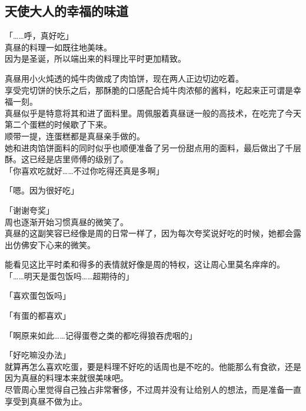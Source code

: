 \subsection{天使大人的幸福的味道}

「……呼，真好吃」\\

真昼的料理一如既往地美味。\\

因为是圣诞，所以端出来的料理比平时更加精致。

真昼用小火炖透的炖牛肉做成了肉馅饼，现在两人正边切边吃着。\\

享受完切饼的快乐之后，那酥脆的口感配合炖牛肉浓郁的酱料，吃起来正可谓是幸福一刻。\\

真昼似乎是特意将其和进了面料里。周佩服着真昼谜一般的高技术，在吃完了今天第二个蛋糕的时候歇了下来。\\%

顺带一提，连蛋糕都是真昼亲手做的。\\

她和进肉馅饼面料的同时似乎也顺便准备了另一份甜点用的面料，最后做出了千层酥。这已经是店里师傅的级别了。\\

「你喜欢吃就好……不过你吃得还真是多啊」

「嗯。因为很好吃」

「谢谢夸奖」\\

周也逐渐开始习惯真昼的微笑了。\\

真昼的这副笑容已经像是周的日常一样了，因为每次夸奖说好吃的时候，她都会露出仿佛安下心来的微笑。

能看见这比平时柔和得多的表情就好像是周的特权，这让周心里莫名痒痒的。\\

「……明天是蛋包饭吗……超期待的」

「喜欢蛋包饭吗」

「有蛋的都喜欢」

「啊原来如此……记得蛋卷之类的都吃得狼吞虎咽的」

「好吃嘛没办法」\\

就算再怎么喜欢吃蛋，要是料理不好吃的话周也是不吃的。他能那么有食欲，还是因为真昼的料理本来就很美味吧。\\

尽管周心里觉得自己独占非常奢侈，不过周并没有让给别人的想法，而是准备一直享受到真昼不做为止。\\

